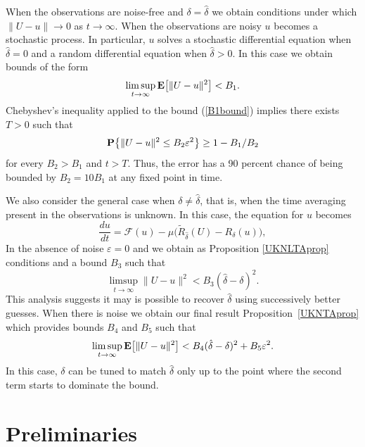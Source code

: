 \documentclass[master,tocprelim,12pt]{unrthesis}
\theoremstyle{definition}
\newcommand{\cF}{{\mathcal F}}
\newcommand{\cO}{{\mathcal O}}
\numberwithin{equation}{chapter}
\begin{document}
\begin{manuscript}
When the observations
are noise-free and $\delta=\hat\delta$ we obtain conditions 
under which $\|U-u\|\to 0$ as $t\to\infty$.
When the observations 
are noisy
$u$ becomes a stochastic process.
In particular, $u$ solves a stochastic differential equation 
when $\hat\delta=0$ and a 
random differential equation when $\hat\delta>0$.
In this case we obtain
bounds of the form
\begin{equation}\label{B1bound}
	\limsup_{t\to\infty} {\bf E}\big[\|U-u\|^2\big]< B_1.
\end{equation}
Chebyshev's inequality applied to the bound (\ref{B1bound}) implies 
there exists $T>0$ such that
\begin{equation}\label{cheby}
	{\bf P}\big\{ \|U-u\|^2\le B_2\varepsilon^2\big\} \ge 1-B_1/B_2
\end{equation}
for every $B_2>B_1$ and $t>T$.
Thus, the error has a 90 
percent chance of being bounded by $B_2=10B_1$ at any fixed
point in time.

We also consider the general case when 
$\delta\ne\hat\delta$, that is, when the time averaging present 
in the observations is unknown.  
In this case, the equation for $u$ becomes
\begin{equation}\label{NLTAUnkSoln}
    \frac{du}{dt} = \cF(u) -
    \mu \big(\widetilde R_{\hat\delta}(U)
    - {R}_{\delta}
    (u)\big),
\end{equation}
In the absence of noise $\varepsilon=0$ and we 
obtain as Proposition \ref{UKNLTAprop}
conditions and a bound
$B_3$ such that
\begin{equation}\label{lessdeltadelta}
	\limsup_{t\to\infty} \|U-u\|^2 < B_3 (\hat\delta-\delta)^2.
\end{equation}
This analysis suggests it may is possible to recover 
$\hat\delta$ using successively better guesses.
When there is noise we obtain our final
result Proposition~\ref{UKNTAprop} which provides
bounds $B_4$ and $B_5$ such that
\begin{equation}\label{noisydeltadelta}
	\limsup_{t\to\infty} {\bf E}\big[\|U-u\|^2\big] 
		< B_4 (\hat\delta-\delta)^2 + B_5\varepsilon^2.
\end{equation}
In this case, $\delta$ can be tuned to 
match $\hat\delta$ only up to the point 
where the second term starts to dominate the bound.




\chapter{Preliminaries}


\end{manuscript}
\end{document}
